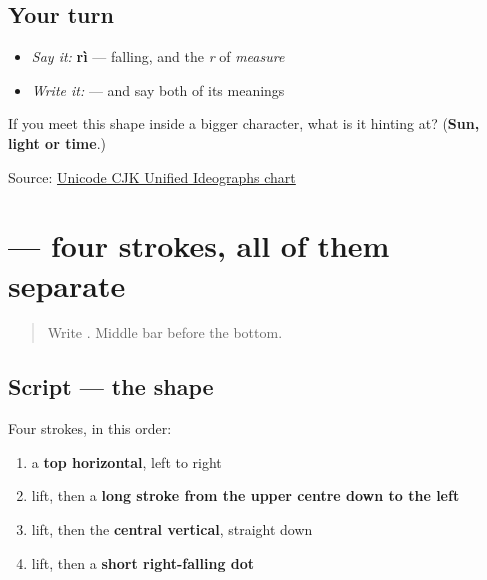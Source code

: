 \subsection*{Your turn}
\begin{itemize}
\raggedright
  \item \emph{Say it:} \textbf{rì} — falling, and the \emph{r} of \emph{measure}
  \item \emph{Write it:}  — and say both of its meanings
\end{itemize}

\begin{tcolorbox}[breakable,colback=teal!4,colframe=teal!35!black,title={Before you move on}]
If you meet this shape inside a bigger character, what is it hinting at? (\textbf{Sun, light or time}.)

Source: \href{https://www.unicode.org/charts/PDF/U4E00.pdf}{Unicode CJK Unified Ideographs chart}
\end{tcolorbox}
\section[\texorpdfstring{\zh{不} (bù)}{不 (bù)}]{ — four strokes, all of them separate}

\label{lesson:ZH-W04-bu}



\begin{quote}
Write . Middle bar before the bottom.
\end{quote}

\subsection*{Script — the shape}

\begin{quote}
\end{quote}

Four strokes, in this order:

\begin{enumerate}
\raggedright
  \item a \textbf{top horizontal}, left to right
  \item lift, then a \textbf{long stroke from the upper centre down to the left}
  \item lift, then the \textbf{central vertical}, straight down
  \item lift, then a \textbf{short right-falling dot}
\end{enumerate}

